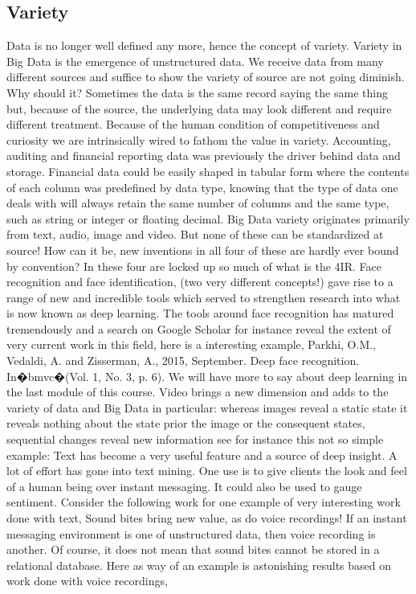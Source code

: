\subsection{Variety}
Data is no longer well defined any more, hence the concept of variety.  Variety in Big Data is the emergence of unstructured data.  We receive data from many different sources and suffice to show the variety of source are not going diminish.  Why should it? Sometimes the data is the same record saying the same thing but, because of the source, the underlying data may look different and require different treatment.  Because of the human condition of competitiveness and curiosity we are intrinsically wired to fathom the value in variety.  Accounting, auditing and financial reporting data was previously the driver behind data and storage.  Financial data could be easily shaped in tabular form where the contents of each column was predefined by data type, knowing that the type of data one deals with will always retain the same number of columns and the same type, such as string or integer or floating decimal.  
Big Data variety originates primarily from text, audio, image and video.  But none of these can be standardized at source! How can it be, new inventions in all four of these are hardly ever bound by convention?  In these four are locked up so much of what is the 4IR.
 Face recognition and face identification, (two very different concepts!) gave rise to a range of new and incredible tools which served to strengthen research into what is now known as deep learning.
 The tools around face recognition has matured tremendously and a search on Google Scholar for instance reveal the extent of very current work in this field, here is a interesting example, \cite{} Parkhi, O.M., Vedaldi, A. and Zisserman, A., 2015, September. Deep face recognition. In�bmvc�(Vol. 1, No. 3, p. 6). We will have more to say about deep learning in the last module of this course.
 Video brings a new dimension and adds to the variety of data and Big Data in particular: whereas images reveal a static state it reveals nothing about the state prior the image or the consequent states, sequential changes reveal new information see for instance this not so simple example: \cite{liu2011human}
 Text has become a very useful feature and a source of deep insight.  A lot of effort has gone into text mining.  One use is to give clients the look and feel of a human being over instant messaging.  It could also be used to gauge sentiment.  Consider the following work for one example of very interesting work done with text, \cite{Majumder2017}
 Sound bites bring new value, as do voice recordings!  If an instant messaging environment is one of unstructured data, then voice recording is another.  Of course, it does not mean that sound bites cannot be stored in a relational database.  Here as way of an example is astonishing results based on work done with voice recordings, \cite{fang2019detection}
